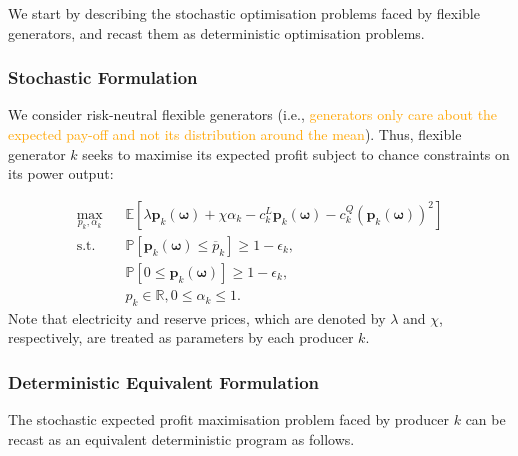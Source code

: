 \documentclass{article}
\begin{document}
We start by describing the stochastic optimisation problems faced by flexible generators, and recast them as deterministic optimisation problems.

\subsubsection{Stochastic Formulation}

We consider risk-neutral flexible generators (i.e., \textcolor{orange}{generators only care about the expected pay-off and not its distribution around the mean}). Thus, flexible generator $k$ seeks to maximise its expected profit subject to chance constraints on its power output:

\begin{align}
\underset{p_k, \alpha_k}{\max} \hspace{10pt} & \mathbb{E}[\lambda \mathbf{p}_k(\boldsymbol{\omega}) + \chi \alpha_k - c_k^L \mathbf{p}_k(\boldsymbol{\omega}) - c_k^Q (\mathbf{p}_k(\boldsymbol{\omega}))^2]\\
\mbox{s.t. } & \mathbb{P}[\mathbf{p}_k(\boldsymbol{\omega}) \le \overline{p}_k] \ge 1 - \epsilon_k,\\
& \mathbb{P}[0 \le \mathbf{p}_k(\boldsymbol{\omega})] \ge 1 - \epsilon_k,\\
&p_k \in \mathbb{R}, 0 \le \alpha_k \le 1.
\end{align}
Note that electricity and reserve prices, which are denoted by $\lambda$ and $\chi$, respectively, are treated as parameters by each producer $k$.
\subsubsection{Deterministic Equivalent Formulation}

The stochastic expected profit maximisation problem faced by producer $k$ can be recast as an equivalent deterministic program as follows. 
\end{document}
